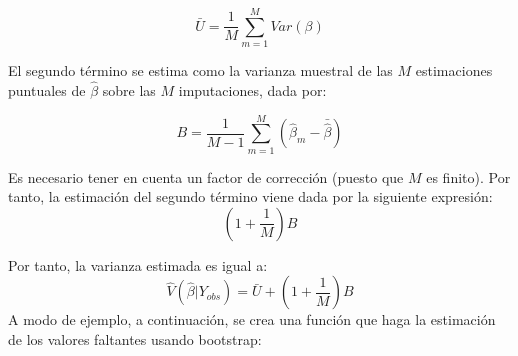 \documentclass[
  spanish,
  12pt,
]{book}
\begin{document}
\[\bar{U} = \frac{1}{M} \sum_{m = 1} ^ M Var(\beta)\]

El segundo término se estima como la varianza muestral de las \(M\) estimaciones
puntuales de \(\hat{\beta}\) sobre las \(M\) imputaciones, dada por:

\[B = \frac{1}{M-1} \sum_{m = 1} ^ M (\hat{\beta}_m - \bar{\hat{\beta}})\]

Es necesario tener en cuenta un factor de corrección (puesto que \(M\) es finito).
Por tanto, la estimación del segundo término viene dada por la siguiente
expresión:
\[
(1 + \frac{1}{M}) B
\]

Por tanto, la varianza estimada es igual a:
\[\hat{V}(\hat{\beta} | Y_{obs}) = \bar{U} + (1 + \frac{1}{M}) B\]
A modo de ejemplo, a continuación, se crea una función que haga la estimación de los valores faltantes usando bootstrap:
\end{document}
